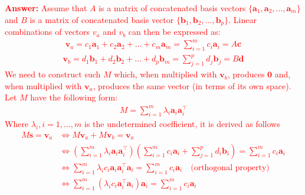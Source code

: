 \documentclass[letterpaper,12pt]{article}
\begin{document}
\begin{itemize}
	\textcolor{red}{\textbf{Answer:} Assume that $A$ is a matrix of concatenated basis vectors $\{\mathbf{a}_1, \mathbf{a}_2,\ldots, \mathbf{a}_m\}$ and $B$ is a matrix of concatenated basis vector $\{\mathbf{b}_1, \mathbf{b}_2,\ldots, \mathbf{b}_p\}$.  Linear combinations of vectors $v_a$ and $v_b$ can then be expressed as:
	\begin{equation*}
		\begin{aligned}
			\mathbf{v}_a=c_1\mathbf{a}_1+c_2\mathbf{a}_2+ \ldots + c_m\mathbf{a}_m = \sum_{i=1}^{m} c_i\mathbf{a}_i = A\mathbf{c}
		\end{aligned}
		\label{eq: ai_vector-weighted_sum}
	\end{equation*}
	\begin{equation*}
		\begin{aligned}
			\mathbf{v}_b=d_1\mathbf{b}_1+d_2\mathbf{b}_2+ \ldots + d_p\mathbf{b}_m = \sum_{j=1}^{p} d_j\mathbf{b}_j = B\mathbf{d}
		\end{aligned}
		\label{eq: bj_vector-weighted_sum}
	\end{equation*}
	We need to construct such $M$ which, when multiplied with $\mathbf{v}_b$, produces $\mathbf{0}$ and, when multiplied with $\mathbf{v}_a$, produces the same vector (in terms of its own space). Let $M$ have the following form:
	\begin{equation*}
		\begin{aligned}
			M = \sum_{i=1}^{m}\lambda_i \mathbf{a}_i\mathbf{a}_i^\top
		\end{aligned}
		\label{eq: M_assumed}
	\end{equation*}
	Where $\lambda_i, i=1,\ldots, m$ is the undetermined coefficient, it is derived as follows
	\begin{equation*}
		\begin{aligned}
			M\mathbf{s}=\mathbf{v}_a &\Leftrightarrow M\mathbf{v}_a + M\mathbf{v}_b=\mathbf{v}_a \\
			&\Leftrightarrow \left(\sum_{i=1}^{m}\lambda_i \mathbf{a}_i \mathbf{a}_i^\top \right)\left(\sum_{i=1}^{m} c_i \mathbf{a}_i + \sum_{j=1}^{p} d_i \mathbf{b}_i \right) = \sum_{i=1}^{m} c_i \mathbf{a}_i \\
			&\Leftrightarrow \sum_{i=1}^{m} \lambda_i c_i \mathbf{a}_i \mathbf{a}_i^\top \mathbf{a}_i = \sum_{i=1}^{m} c_i \mathbf{a}_i  \quad \text{(orthogonal property)} \\	
			&\Leftrightarrow \sum_{i=1}^{m} (\lambda_i c_i \mathbf{a}_i^\top \mathbf{a}_i) \mathbf{a}_i = \sum_{i=1}^{m} c_i \mathbf{a}_i \\

\end{aligned}
\end{equation*}}
\end{itemize}
\end{document}

